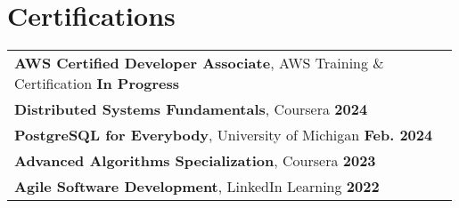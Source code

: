 \documentclass[letterpaper,11pt]{article}
\begin{document}
\section{Certifications}
\begin{tabular}{p{0.99\linewidth}}
    \hspace{0.15in}\textbf{AWS Certified Developer Associate}, AWS Training \& Certification
        \hfill \textbf{In Progress} \\
    \hspace{0.15in}\textbf{Distributed Systems Fundamentals}, Coursera
        \hfill \textbf{2024} \\
    \hspace{0.15in}\textbf{PostgreSQL for Everybody}, University of Michigan
        \hfill \textbf{Feb. 2024} \\
    \hspace{0.15in}\textbf{Advanced Algorithms Specialization}, Coursera
        \hfill \textbf{2023} \\
    \hspace{0.15in}\textbf{Agile Software Development}, LinkedIn Learning
        \hfill \textbf{2022} \\
\end{tabular}
\end{document}
